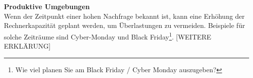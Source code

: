 \\\\
\textbf{Produktive Umgebungen}\\
Wenn der Zeitpunkt einer hohen Nachfrage bekannt ist, kann eine Erhöhung der Rechnerkapazität geplant werden, um Überlastungen zu vermeiden. Beispiele für solche Zeiträume sind Cyber-Monday und Black Friday\footnote{\cite{STA5}Wie viel planen Sie am Black Friday / Cyber Monday auszugeben?}. 
[WEITERE ERKLÄRUNG]

